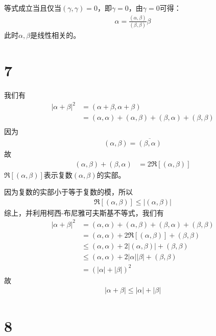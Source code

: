 \documentclass{article}
\begin{document}
等式成立当且仅当$(\gamma, \gamma) = 0$，即$\gamma = 0$，由$\gamma = 0$可得：
\begin{align*}
  \alpha = \frac{(\alpha, \beta)}{(\beta, \beta)} \beta
\end{align*}
此时$\alpha, \beta$是线性相关的。

\section*{7}

我们有
\begin{align*}
  |\alpha + \beta|^2
   & = (\alpha + \beta, \alpha + \beta)                                      \\
   & = (\alpha, \alpha) + (\alpha, \beta) + (\beta, \alpha) + (\beta, \beta) \\
\end{align*}
因为
\begin{align*}
  (\alpha, \beta) = \overline{(\beta, \alpha)}
\end{align*}
故
\begin{align*}
  (\alpha, \beta) + (\beta, \alpha) & = 2 \Re [(\alpha, \beta)]
\end{align*}
$\Re [(\alpha, \beta)]$表示复数$(\alpha, \beta)$的实部。

因为复数的实部小于等于复数的模，所以
\begin{align*}
  \Re [(\alpha, \beta)] \leq |(\alpha, \beta)|
\end{align*}
综上，并利用柯西-布尼雅可夫斯基不等式，我们有
\begin{align*}
  |\alpha + \beta|^2
   & = (\alpha, \alpha) + (\alpha, \beta) + (\beta, \alpha) + (\beta, \beta) \\
   & = (\alpha, \alpha)  + 2 \Re [(\alpha, \beta)] + (\beta, \beta)          \\
   & \leq (\alpha, \alpha)  + 2 |(\alpha, \beta)| + (\beta, \beta)           \\
   & \leq (\alpha, \alpha)  + 2 |\alpha| |\beta| + (\beta, \beta)            \\
   & = (|\alpha| + |\beta|)^2
\end{align*}
故
\begin{align*}
  |\alpha + \beta| \leq |\alpha| + |\beta|
\end{align*}

\section*{8}
\end{document}
